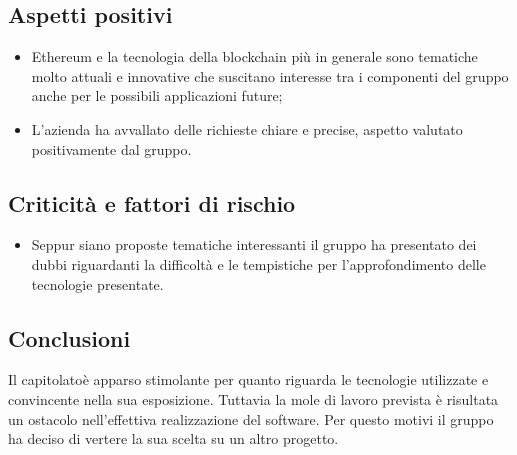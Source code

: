 \subsection{Aspetti positivi}
\begin{itemize}
    \item Ethereum e la tecnologia della blockchain più in generale sono tematiche molto attuali e innovative che suscitano interesse tra i componenti del gruppo
    anche per le possibili applicazioni future;
    \item L'azienda ha avvallato delle richieste chiare e precise, aspetto valutato positivamente dal gruppo.
\end{itemize}
\subsection{Criticità e fattori di rischio}
\begin{itemize}
    \item Seppur siano proposte tematiche interessanti il gruppo ha presentato dei dubbi riguardanti la difficoltà e le tempistiche per l'approfondimento
    delle tecnologie presentate.
\end{itemize}
\subsection{Conclusioni}
Il capitolato\glosp è apparso stimolante per quanto riguarda le tecnologie utilizzate e convincente nella sua esposizione. Tuttavia la mole di lavoro prevista è risultata un ostacolo nell'effettiva realizzazione del software. Per questo motivi il gruppo ha deciso di vertere la sua scelta su un altro progetto\glo.
